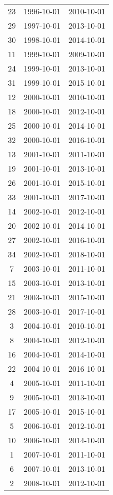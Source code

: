 % 
\begin{tabular}{ccc}
  \hline
  \hline
23 & 1996-10-01 & 2010-10-01 \\ 
  29 & 1997-10-01 & 2013-10-01 \\ 
  30 & 1998-10-01 & 2014-10-01 \\ 
  11 & 1999-10-01 & 2009-10-01 \\ 
  24 & 1999-10-01 & 2013-10-01 \\ 
  31 & 1999-10-01 & 2015-10-01 \\ 
  12 & 2000-10-01 & 2010-10-01 \\ 
  18 & 2000-10-01 & 2012-10-01 \\ 
  25 & 2000-10-01 & 2014-10-01 \\ 
  32 & 2000-10-01 & 2016-10-01 \\ 
  13 & 2001-10-01 & 2011-10-01 \\ 
  19 & 2001-10-01 & 2013-10-01 \\ 
  26 & 2001-10-01 & 2015-10-01 \\ 
  33 & 2001-10-01 & 2017-10-01 \\ 
  14 & 2002-10-01 & 2012-10-01 \\ 
  20 & 2002-10-01 & 2014-10-01 \\ 
  27 & 2002-10-01 & 2016-10-01 \\ 
  34 & 2002-10-01 & 2018-10-01 \\ 
  7 & 2003-10-01 & 2011-10-01 \\ 
  15 & 2003-10-01 & 2013-10-01 \\ 
  21 & 2003-10-01 & 2015-10-01 \\ 
  28 & 2003-10-01 & 2017-10-01 \\ 
  3 & 2004-10-01 & 2010-10-01 \\ 
  8 & 2004-10-01 & 2012-10-01 \\ 
  16 & 2004-10-01 & 2014-10-01 \\ 
  22 & 2004-10-01 & 2016-10-01 \\ 
  4 & 2005-10-01 & 2011-10-01 \\ 
  9 & 2005-10-01 & 2013-10-01 \\ 
  17 & 2005-10-01 & 2015-10-01 \\ 
  5 & 2006-10-01 & 2012-10-01 \\ 
  10 & 2006-10-01 & 2014-10-01 \\ 
  1 & 2007-10-01 & 2011-10-01 \\ 
  6 & 2007-10-01 & 2013-10-01 \\ 
  2 & 2008-10-01 & 2012-10-01 \\ 
   \hline
\end{tabular}
